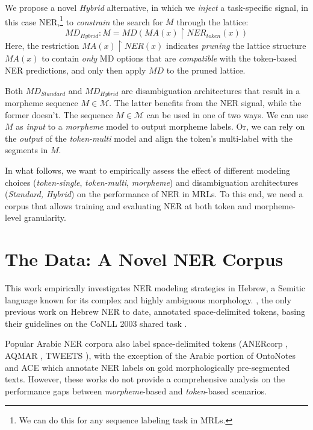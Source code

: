 \documentclass[11pt,a4paper]{article}
\newcommand{\TOKMACRO}{{\em token-single}\xspace}
\newcommand{\MULMACRO}{{\em token-multi}\xspace}
\newcommand{\MORMACRO}{{\em morpheme}\xspace}
\newcommand{\FLIPMACRO}{{\em Hybrid}\xspace}
\begin{document}
We propose 
a novel \FLIPMACRO alternative, in which we {\em inject} a task-specific signal, in this  case NER,\footnote{We can do this for any sequence labeling task in MRLs.}  
to {\em constrain}  the search for \(M\) through the  lattice:
    \[MD_\textit{Hybrid}: M=MD(MA(x)\restriction
     \textit{NER}_\textit{token}(x))\]
Here, the restriction \(MA(x)\restriction NER(x)\) indicates {\em pruning} the  lattice structure \(MA(x)\) to  contain {\em only}  MD options that are  {\em compatible} with the token-based NER  predictions, and only then apply \(MD\) to the pruned lattice.

Both \(MD_\textit{Standard}\) and \(MD_\textit{Hybrid}\) are  disambiguation architectures that result in a  morpheme sequence \(M\in\mathcal{M}\). The latter benefits from the NER signal, while the former doesn't.
The sequence \(M\in\mathcal{M}\)  can  be used in one of two ways. 
 We can use  \(M\) as \emph{input} to a \MORMACRO model to output morpheme labels.
Or, we can {rely on} the {\em output} of the  \MULMACRO model and align the token's multi-label with the  segments  in \(M\).

In what follows, we want to empirically assess the effect of different modeling choices (\TOKMACRO, \MULMACRO, \MORMACRO) and disambiguation architectures ({\em Standard, Hybrid}) on the performance of NER in MRLs. To this end, we need a corpus that allows  training and evaluating NER  at both  token and morpheme-level granularity.

\section{The Data: A Novel NER Corpus} 
\label{sec:the-data}

This work empirically investigates NER modeling strategies in  Hebrew, a Semitic language known for its complex and highly ambiguous morphology.
 \citet{naama}, the only previous work on Hebrew NER to date, annotated  space-delimited tokens, basing their guidelines on the CoNLL 2003 shared task \cite{Chinchor99}.  
 
 Popular Arabic NER corpora also label space-delimited tokens (ANERcorp \cite{benajiba-2007-anersys}, AQMAR \cite{mohit-etal-2012-recall}, TWEETS \cite{darwish-2013-named}), with the exception of the Arabic portion of OntoNotes \cite{weischedel2013ontonotes} and ACE \cite{linguistic2008ace} 
which annotate NER labels on gold morphologically pre-segmented texts. However, these works do not provide  a  comprehensive analysis  on the performance gaps between \MORMACRO-based and {\em token}-based  scenarios. 
\end{document}
